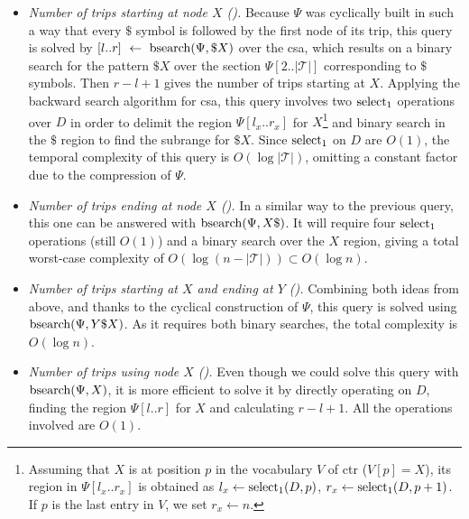	\begin{itemize}
	\item {\em Number of trips starting at node $X$ (\startX).}
	Because $\Psi$ was cyclically built in such a way that every $\$$ symbol is followed by the first node 
	of its trip, this query is solved by $[l..r]~\leftarrow~\operatorname{bsearch}(\Psi,\$X)$ over the \gls{csa}, 
	which results on a binary search for the pattern $\$X$ over the section $\Psi[2..|\mathcal{T}|]$ corresponding to $\$$ symbols. 
	Then $r-l+1$ gives the number of trips starting at $X$.
	Applying the backward search algorithm for \gls{csa}, this query involves two $\operatorname{select}_1$ operations over $D$ in order to delimit the region $\Psi[l_x..r_x]$ for $X$\footnote{Assuming that $X$ is at position $p$ in the vocabulary $V$ of \gls{ctr} ($V[p]=X$), its region in $\Psi[l_x..r_x]$ is obtained as $l_x \leftarrow \operatorname{select}_1(D,p)$,  $r_x \leftarrow \operatorname{select}_1(D,p+1)$. If $p$ is the last entry in $V$, we set $r_x \leftarrow n$.} and binary search in the $\$$ region to find the subrange for $\$X$. Since $\operatorname{select}_1$ on $D$ are $O(1)$, the temporal complexity of this query is $O(\log|\mathcal{T}|)$, omitting a constant factor due to the compression of $\Psi$.

	\item {\em Number of trips ending at node $X$ (\endX).} In a similar way to the previous query, this one can be answered with $\operatorname{bsearch}(\Psi,X\$)$. It will require four $\operatorname{select}_1$ operations (still $O(1)$) and a binary search over the $X$ region, giving a total worst-case complexity of $O(\log (n - |\mathcal{T}|)) \subset O(\log n)$.

	\item {\em Number of trips starting at $X$ and ending at $Y$ (\XtoY).}
	Combining both ideas from above, and thanks to the cyclical construction of $\Psi$, this query is solved using $\operatorname{bsearch}(\Psi,Y\$X)$. As it requires both binary searches, the total complexity is $O(\log n)$.

	\item {\em Number of trips using node $X$ (\loadX).}
	Even though we could solve this query with $\operatorname{bsearch}(\Psi,X)$, it is more efficient to solve it by directly operating on $D$, finding the region $\Psi[l..r]$ for $X$ and calculating $r-l+1$. All the operations involved are $O(1)$.


\end{itemize}
